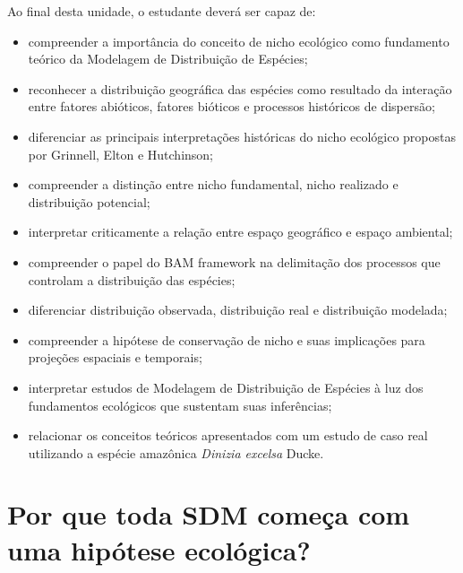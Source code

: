 \begin{objetivos}
	Ao final desta unidade, o estudante deverá ser capaz de:
	
	\begin{itemize}
		
		\item compreender a importância do conceito de nicho ecológico como fundamento teórico da Modelagem de Distribuição de Espécies;
		
		\item reconhecer a distribuição geográfica das espécies como resultado da interação entre fatores abióticos, fatores bióticos e processos históricos de dispersão;
		
		\item diferenciar as principais interpretações históricas do nicho ecológico propostas por Grinnell, Elton e Hutchinson;
		
		\item compreender a distinção entre nicho fundamental, nicho realizado e distribuição potencial;
		
		\item interpretar criticamente a relação entre espaço geográfico e espaço ambiental;
		
		\item compreender o papel do BAM framework na delimitação dos processos que controlam a distribuição das espécies;
		
		\item diferenciar distribuição observada, distribuição real e distribuição modelada;
		
		\item compreender a hipótese de conservação de nicho e suas implicações para projeções espaciais e temporais;
		
		\item interpretar estudos de Modelagem de Distribuição de Espécies à luz dos fundamentos ecológicos que sustentam suas inferências;
		
		\item relacionar os conceitos teóricos apresentados com um estudo de caso real utilizando a espécie amazônica \textit{Dinizia excelsa} Ducke.
		
	\end{itemize}
	
\end{objetivos}

\section{Por que toda SDM começa com uma hipótese ecológica?}

